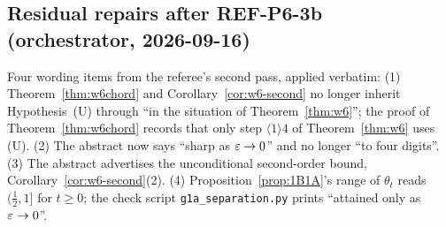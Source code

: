\documentclass[11pt]{article}
\theoremstyle{definition}\newtheorem{example}[theorem]{Example}
\begin{document}
\subsection*{Residual repairs after REF-P6-3b (orchestrator, 2026-09-16)}
Four wording items from the referee's second pass, applied verbatim: (1) Theorem~\ref{thm:w6chord} and
Corollary~\ref{cor:w6-second} no longer inherit Hypothesis~(U) through ``in the situation of
Theorem~\ref{thm:w6}''; the proof of Theorem~\ref{thm:w6chord} records that only step $\langle1\rangle4$ of
Theorem~\ref{thm:w6} uses (U). (2) The abstract now says ``sharp as $\varepsilon\to0$'' and no longer ``to four
digits''. (3) The abstract advertises the unconditional second-order bound, Corollary~\ref{cor:w6-second}(2).
(4) Proposition~\ref{prop:1B1A}'s range of $\theta_t$ reads $(\tfrac12,1]$ for $t\ge0$; the check script
\texttt{g1a\_separation.py} prints ``attained only as $\varepsilon\to0$''.
\end{document}
